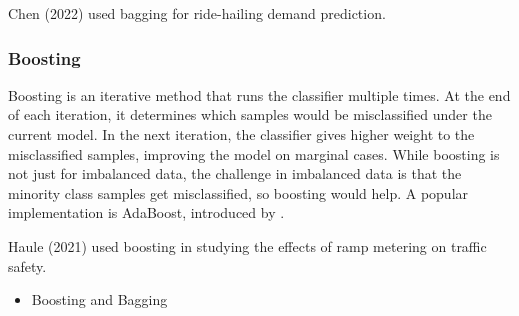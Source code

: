 Chen (2022) used bagging for ride-hailing demand prediction.  \cite{CHEN2022103709} 



\subsubsection{Boosting}

Boosting is an iterative method that runs the classifier multiple times.  At the end of each iteration, it determines which samples would be misclassified under the current model.  In the next iteration, the classifier gives higher weight to the misclassified samples, improving the model on marginal cases.  While boosting is not just for imbalanced data, the challenge in imbalanced data is that the minority class samples get misclassified, so boosting would help.  A popular implementation is AdaBoost, introduced by \cite{FREUND1997119}.


Haule (2021) used boosting in studying the effects of ramp metering on traffic safety.  \cite{HAULE2021106181}


\begin{itemize}
	\item Boosting and Bagging 
	\cite{BATISTA_2004} 
	\cite{CHABBOUH_2019} 
	\cite{DABLAIN_2021} 
	\cite{MAHMUDAH_2021} 
	\cite{SHARIFIFAR_2019}
\end{itemize}
